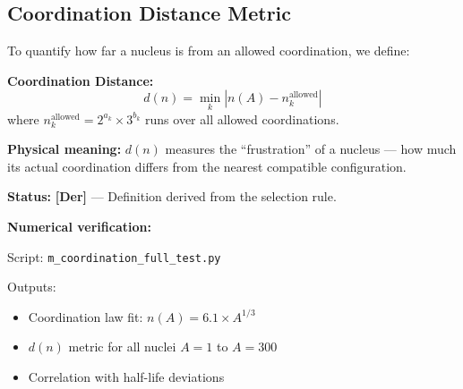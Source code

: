 \documentclass[11pt,a4paper]{article}
\newcommand{\tagDer}{\textcolor{green!50!black}{\textbf{[Der]}}}
\begin{document}
\begin{center}
\end{center}

\subsection{Coordination Distance Metric}

To quantify how far a nucleus is from an allowed coordination, we define:

\begin{derivbox}
\textbf{Coordination Distance:}
\begin{equation}
    d(n) = \min_k \left| n(A) - n_k^{\text{allowed}} \right|
    \label{eq:coord_distance}
\end{equation}
where $n_k^{\text{allowed}} = 2^{a_k} \times 3^{b_k}$ runs over all allowed coordinations.

\textbf{Physical meaning:} $d(n)$ measures the ``frustration'' of a nucleus --- how much its actual coordination differs from the nearest compatible configuration.
\end{derivbox}

\textbf{Status:} \tagDer{} --- Definition derived from the selection rule.

\begin{scriptbox}
\textbf{Numerical verification:}

Script: \texttt{m\_coordination\_full\_test.py}

Outputs:
\begin{itemize}[nosep]
    \item Coordination law fit: $n(A) = 6.1 \times A^{1/3}$
    \item $d(n)$ metric for all nuclei $A = 1$ to $A = 300$
    \item Correlation with half-life deviations
\end{itemize}
\end{scriptbox}
\end{document}
